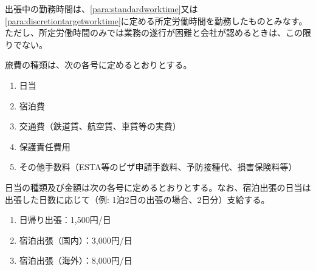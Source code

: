 \documentclass[10pt,a4paper,uplatex]{jsarticle}
\begin{document}
出張中の勤務時間は、\ref{para:standardworktime}又は\ref{para:discretiontargetworktime}に定める所定労働時間を勤務したものとみなす。ただし、所定労働時間のみでは業務の遂行が困難と会社が認めるときは、この限りでない。

旅費の種類は、次の各号に定めるとおりとする。
\begin{enumerate}
    \item 日当
    \item 宿泊費
    \item 交通費（鉄道賃、航空賃、車賃等の実費）
    \item 保護責任費用
    \item その他手数料（ESTA等のビザ申請手数料、予防接種代、損害保険料等）
\end{enumerate}

日当の種類及び金額は次の各号に定めるとおりとする。なお、宿泊出張の日当は出張した日数に応じて（例: 1泊2日の出張の場合、2日分）支給する。
\begin{enumerate}
    \item 日帰り出張：1,500円/日
    \item 宿泊出張（国内）：3,000円/日
    \item 宿泊出張（海外）：8,000円/日
\end{enumerate}
\end{document}
